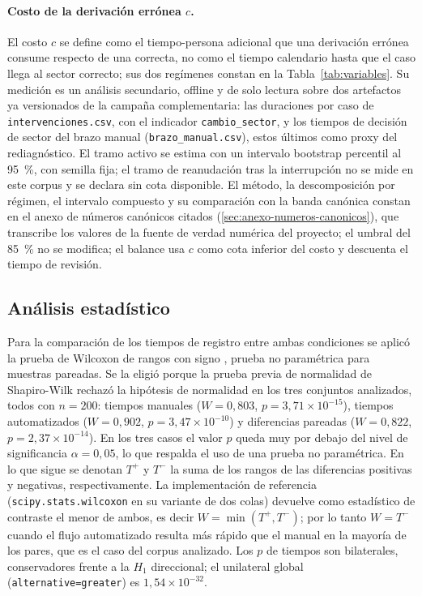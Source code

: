 \paragraph{Costo de la derivación errónea \(c\).} El costo \(c\) se define como el tiempo-persona adicional que una derivación errónea consume respecto de una correcta, no como el tiempo calendario hasta que el caso llega al sector correcto; sus dos regímenes constan en la Tabla~\ref{tab:variables}. Su medición es un análisis secundario, offline y de solo lectura sobre dos artefactos ya versionados de la campaña complementaria: las duraciones por caso de \texttt{intervenciones.csv}, con el indicador \texttt{cambio\_sector}, y los tiempos de decisión de sector del brazo manual (\texttt{brazo\_manual.csv}), estos últimos como proxy del rediagnóstico. El tramo activo se estima con un intervalo bootstrap percentil al 95~\%, con semilla fija; el tramo de reanudación tras la interrupción no se mide en este corpus y se declara sin cota disponible. El método, la descomposición por régimen, el intervalo compuesto y su comparación con la banda canónica constan en el anexo de números canónicos citados (\autoref{sec:anexo-numeros-canonicos}), que transcribe los valores de la fuente de verdad numérica del proyecto; el umbral del 85~\% no se modifica; el balance usa \(c\) como cota inferior del costo y descuenta el tiempo de revisión.

\subsection{Análisis estadístico}\label{subsec:analisis-estadistico}

Para la comparación de los tiempos de registro entre ambas condiciones se aplicó la prueba de Wilcoxon de rangos con signo \parencite{Wilcoxon1945_individual_comparisons}, prueba no paramétrica para muestras pareadas. Se la eligió porque la prueba previa de normalidad de Shapiro-Wilk \parencite{Shapiro1965_normality} rechazó la hipótesis de normalidad en los tres conjuntos analizados, todos con \(n = 200\): tiempos manuales (\(W = 0{,}803\), \(p = 3{,}71 \times 10^{-15}\)), tiempos automatizados (\(W = 0{,}902\), \(p = 3{,}47 \times 10^{-10}\)) y diferencias pareadas (\(W = 0{,}822\), \(p = 2{,}37 \times 10^{-14}\)). En los tres casos el valor \(p\) queda muy por debajo del nivel de significancia \(\alpha = 0{,}05\), lo que respalda el uso de una prueba no paramétrica. En lo que sigue se denotan \(T^{+}\) y \(T^{-}\) la suma de los rangos de las diferencias positivas y negativas, respectivamente. La implementación de referencia (\texttt{scipy.stats.wilcoxon} en su variante de dos colas) devuelve como estadístico de contraste el menor de ambos, es decir \(W = \min(T^{+}, T^{-})\); por lo tanto \(W = T^{-}\) cuando el flujo automatizado resulta más rápido que el manual en la mayoría de los pares, que es el caso del corpus analizado. Los \(p\) de tiempos son bilaterales, conservadores frente a la \(H_{1}\) direccional; el unilateral global (\texttt{alternative=greater}) es \(1{,}54 \times 10^{-32}\).

